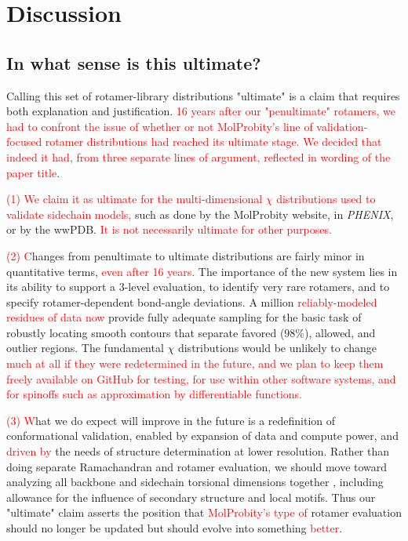\section{Discussion}

\subsection{In what sense is this ultimate?}
Calling this set of rotamer-library distributions "ultimate" is a claim that requires both explanation and justification. \textcolor{red}{16 years after our "penultimate" rotamers, we had to confront the issue of whether or not MolProbity's line of validation-focused rotamer distributions had reached its ultimate stage. We decided that indeed it had, from three separate lines of argument, reflected in wording of the paper title}.

\textcolor{red}{(1) We claim it as ultimate for the multi-dimensional $\chi$ distributions used to validate sidechain models,} such as done by the MolProbity website, in \textit{PHENIX}, or by the wwPDB. \textcolor{red}{It is not necessarily ultimate for other purposes.}

\textcolor{red}{(2) C}hanges from penultimate to ultimate distributions are fairly minor in quantitative terms, \textcolor{red}{even after 16 years.} The importance of the new system lies in its ability to support a 3-level evaluation, to identify very rare rotamers, and to specify rotamer-dependent bond-angle deviations.  A million \textcolor{red}{reliably-modeled residues of data now} provide fully adequate sampling for the basic task of robustly locating smooth contours that separate favored (98\%), allowed, and outlier regions. The fundamental $\chi$ distributions would be unlikely to change \textcolor{red}{much at all if they were redetermined in the future, and we plan to keep them freely available on GitHub for testing, for use within other software systems, and for spinoffs such as approximation by differentiable functions.}

\textcolor{red}{(3)  W}hat we do expect will improve in the future is a redefinition of conformational validation, enabled by expansion of data and compute power, and \textcolor{red}{driven by} the needs of structure determination at lower resolution. Rather than doing separate Ramachandran and rotamer evaluation, we should move toward analyzing all backbone and sidechain torsional dimensions together \cite{JSR_theplot_2013}, including allowance for the influence of secondary structure and local motifs. Thus our "ultimate" claim asserts the position that \textcolor{red}{MolProbity's type of }rotamer evaluation should no longer be updated but should evolve into something \textcolor{red}{better}.

